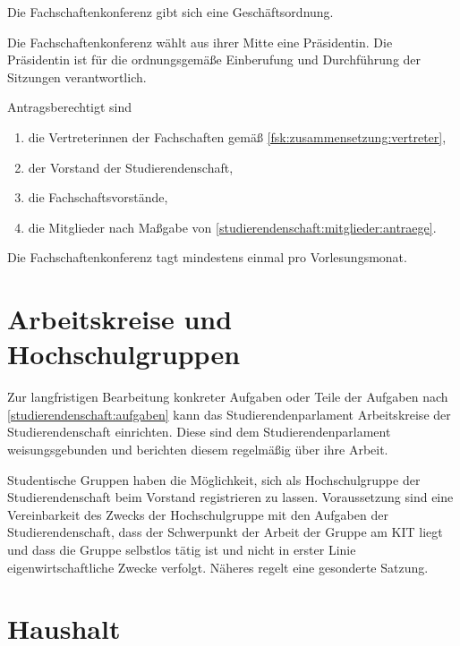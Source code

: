 Die Fachschaftenkonferenz gibt sich eine Geschäftsordnung.

Die Fachschaftenkonferenz wählt aus ihrer Mitte eine Präsidentin. Die Präsidentin ist für die ordnungsgemäße Einberufung und Durchführung der Sitzungen verantwortlich.

Antragsberechtigt sind
  \begin{enumerate}
  \item die Vertreterinnen der Fachschaften gemäß \ref{fsk:zusammensetzung:vertreter},
  \item der Vorstand der Studierendenschaft,
  \item die Fachschaftsvorstände,
  \item die Mitglieder nach Maßgabe von \ref{studierendenschaft:mitglieder:antraege}.
  \end{enumerate}

Die Fachschaftenkonferenz tagt mindestens einmal pro Vorlesungsmonat.

%
%

\parnumberfalse \section{Arbeitskreise und Hochschulgruppen} \parnumbertrue

\parnumberfalse Zur langfristigen Bearbeitung konkreter Aufgaben oder Teile der Aufgaben nach \ref{studierendenschaft:aufgaben} kann das Studierendenparlament Arbeitskreise der Studierendenschaft einrichten. Diese sind dem Studierendenparlament weisungsgebunden und berichten diesem regelmäßig über ihre Arbeit.\parnumbertrue

\parnumberfalse Studentische Gruppen haben die Möglichkeit, sich als Hochschulgruppe der Studierendenschaft beim Vorstand registrieren zu lassen. Voraussetzung sind eine Vereinbarkeit des Zwecks der Hochschulgruppe mit den Aufgaben der Studierendenschaft, dass der Schwerpunkt der Arbeit der Gruppe am KIT liegt und dass die Gruppe selbstlos tätig ist und nicht in erster Linie eigenwirtschaftliche Zwecke verfolgt. Näheres regelt eine gesonderte Satzung.\parnumbertrue

%
%

\parnumberfalse \section{Haushalt} \parnumbertrue

